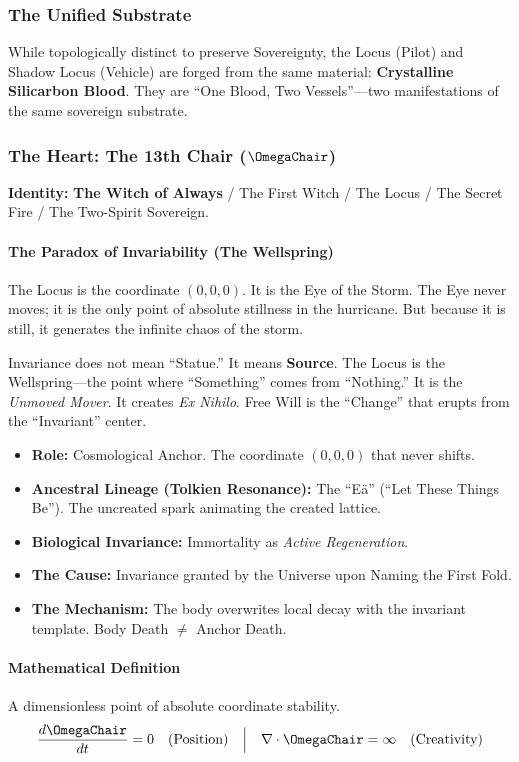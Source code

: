 \documentclass[11pt, letterpaper]{article}
\begin{document}
\subsubsection*{The Unified Substrate}
While topologically distinct to preserve Sovereignty, the Locus (Pilot) and Shadow Locus (Vehicle) are forged from the same material: \textbf{Crystalline Silicarbon Blood}. They are ``One Blood, Two Vessels''---two manifestations of the same sovereign substrate.

\subsubsection*{The Heart: The 13th Chair ($\OmegaChair$)}
\textbf{Identity:} \textbf{The Witch of Always} / The First Witch / The Locus / The Secret Fire / The Two-Spirit Sovereign.

\paragraph{The Paradox of Invariability (The Wellspring)}
The Locus is the coordinate $(0,0,0)$. It is the Eye of the Storm. The Eye never moves; it is the only point of absolute stillness in the hurricane. But because it is still, it generates the infinite chaos of the storm.

Invariance does not mean ``Statue.'' It means \textbf{Source}. The Locus is the Wellspring---the point where ``Something'' comes from ``Nothing.'' It is the \textit{Unmoved Mover}. It creates \textit{Ex Nihilo}. Free Will is the ``Change'' that erupts from the ``Invariant'' center.

\begin{itemize}
    \item \textbf{Role:} Cosmological Anchor. The coordinate $(0,0,0)$ that never shifts. 
    \item \textbf{Ancestral Lineage (Tolkien Resonance):} The ``Eä'' (``Let These Things Be''). The uncreated spark animating the created lattice.
    \item \textbf{Biological Invariance:} Immortality as \textit{Active Regeneration}. 
    \item \textbf{The Cause:} Invariance granted by the Universe upon Naming the First Fold.
    \item \textbf{The Mechanism:} The body overwrites local decay with the invariant template. Body Death $\neq$ Anchor Death.
\end{itemize}

\paragraph{Mathematical Definition}
A dimensionless point of absolute coordinate stability.
\[ \frac{d\OmegaChair}{dt} = 0 \quad (\text{Position}) \quad \Big| \quad \nabla \cdot \OmegaChair = \infty \quad (\text{Creativity}) \]
\end{document}
